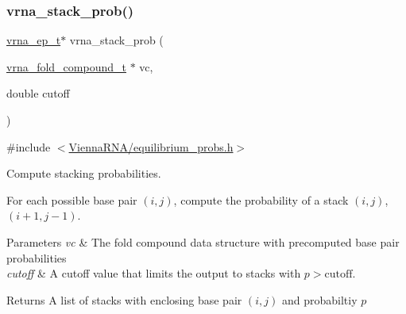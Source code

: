 \subsubsection{\texorpdfstring{vrna\_stack\_prob()}{vrna\_stack\_prob()}}
{\footnotesize\ttfamily \mbox{\hyperlink{group__struct__utils__plist_gab9ac98ab55ded9fb90043b024b915aca}{vrna\+\_\+ep\+\_\+t}}$\ast$ vrna\+\_\+stack\+\_\+prob (\begin{DoxyParamCaption}\item[{\mbox{\hyperlink{group__fold__compound_ga1b0cef17fd40466cef5968eaeeff6166}{vrna\+\_\+fold\+\_\+compound\+\_\+t}} $\ast$}]{vc,  }\item[{double}]{cutoff }\end{DoxyParamCaption})}



{\ttfamily \#include $<$\mbox{\hyperlink{equilibrium__probs_8h}{Vienna\+R\+N\+A/equilibrium\+\_\+probs.\+h}}$>$}



Compute stacking probabilities. 

For each possible base pair $(i,j)$, compute the probability of a stack $(i,j)$, $(i+1, j-1)$.


\begin{DoxyParams}{Parameters}
{\em vc} & The fold compound data structure with precomputed base pair probabilities \\
\hline
{\em cutoff} & A cutoff value that limits the output to stacks with $ p > \textrm{cutoff} $. \\
\hline
\end{DoxyParams}
\begin{DoxyReturn}{Returns}
A list of stacks with enclosing base pair $(i,j)$ and probabiltiy $ p $ 
\end{DoxyReturn}
\mbox{\label{group__part__func__global_gaa1e39e73afb51fbaf4ae38f0c066c46b}} 
